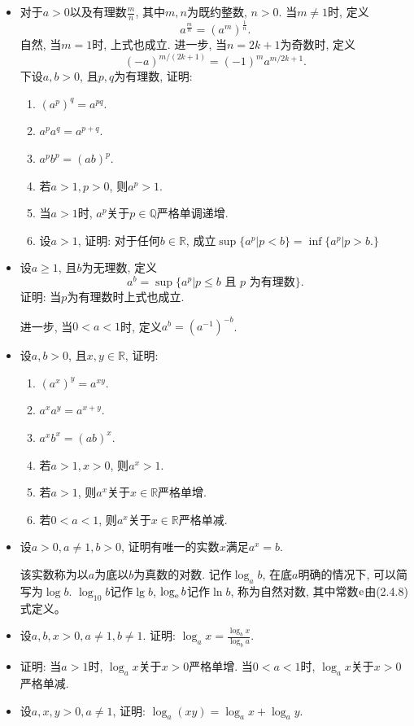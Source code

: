\begin{4b}
\begin{itemize}
\item[1.] 对于\(a>0\)以及有理数\(\frac{m}{n}\), 其中\(m,n\)为既约整数, \(n>0\). 
当\(m\ne 1\)时, 定义\[a^{\frac{m}{n}}=\left(a^m\right)^\frac{1}{n}.\]
    自然, 当\(m=1\)时, 上式也成立. 进一步, 当\(n=2k+1\)为奇数时, 定义
    \[(-a)^{m/(2k+1)}=(-1)^ma^{m/2k+1}.\]
    下设\(a,b>0\), 且\(p,q\)为有理数, 证明:
\begin{enumerate}[label=(\arabic*)]
    \item \((a^p)^q=a^{pq}\).
    \item \(a^pa^q=a^{p+q}\).
    \item \(a^pb^p=(ab)^p\).
    \item 若\(a>1,p>0\), 则\(a^p>1\).
    \item 当\(a>1\)时, \(a^p\)关于\(p\in\mathbb{Q}\)严格单调递增.
    \item 设\(a>1\), 证明: 对于任何\(b\in\mathbb{R}\), 成立\(\sup\{a^p|p<b\}=\inf\{a^p|p>b.\}\)
\end{enumerate}
\item[2.] 设\(a\geqslant 1\), 且\(b\)为无理数, 定义\[a^b=\sup\{a^p|p\leqslant b \text{ 且 }p\text{ 为有理数}\}.\]
证明: 当\(p\)为有理数时上式也成立. 

进一步, 当\(0<a<1\)时, 定义\(a^b=(a^{-1})^{-b}\).
\item[3.] 设\(a,b>0\), 且\(x,y\in \mathbb{R}\), 证明:
\begin{enumerate}[label=(\arabic*)]
\item \((a^x)^y=a^{xy}\).
\item \(a^xa^y=a^{x+y}\).
\item \(a^xb^x=(ab)^x\).
\item 若\(a>1,x>0\), 则\(a^x>1\).
\item 若\(a>1\), 则\(a^x\)关于\(x\in \mathbb{R}\)严格单增.
\item 若\(0<a<1\), 则\(a^x\)关于\(x\in \mathbb{R}\)严格单减.
\end{enumerate}
\item[4.] 设\(a>0,a\ne 1,b>0\), 证明有唯一的实数\(x\)满足\(a^x=b\).
        
该实数称为以\(a\)为底以\(b\)为真数的对数. 记作\(\log_ab\), 
在底\(a\)明确的情况下, 可以简写为\(\log b\). \(\log_{10}b\)记作\(\lg b\), 
\(\log_{\rm e}b\)记作\(\ln b\), 称为自然对数, 其中常数${\rm e}$由(2.4.8)式定义。
\item[5.] 设\(a,b,x>0,a\ne 1,b\ne 1\). 证明: \(\log_ax=\frac{\log_bx}{\log_ba}\).
\item[6.] 证明: 当\(a>1\)时, \(\log_ax\)关于\(x>0\)严格单增. 当\(0<a<1\)时, \(\log_ax\)关于\(x>0\)严格单减.
\item[7.] 设\(a,x,y>0,a\ne 1\), 证明: \(\log_a(xy)=\log_ax+\log_ay\). 
\end{itemize}
\end{4b}
